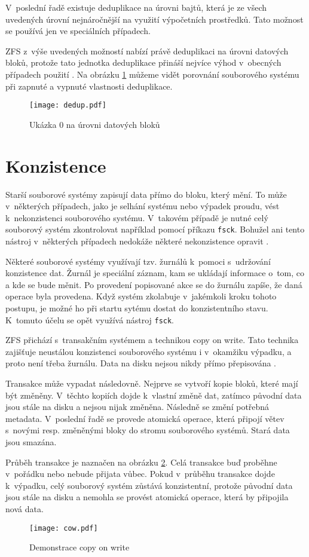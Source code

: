 V~poslední řadě existuje deduplikace na úrovni bajtů, která je ze všech uvedených úrovní nejnáročnější na využití výpočetních prostředků. Tato možnost se používá jen ve speciálních případech.

ZFS z~výše uvedených možností nabízí právě deduplikaci na úrovni datových bloků, protože tato jednotka deduplikace přináší nejvíce výhod v~obecných případech použití \cite{dedup}. Na obrázku \ref{blockdedup} můžeme vidět porovnání souborového systému při zapnuté a vypnuté vlastnosti deduplikace.
\begin{figure}
    \texttt{[image: dedup.pdf]}
    \caption{Ukázka 0 na úrovni datových bloků}
    \label{blockdedup}
\end{figure}
\section{Konzistence}
\label{consitence}
Starší souborové systémy zapisují data přímo do bloku, který mění. To může v~některých případech, jako je selhání systému nebo výpadek proudu, vést k~nekonzistenci souborového systému. V~takovém případě je nutné celý souborový systém zkontrolovat například pomocí příkazu \verb|fsck|. Bohužel ani tento nástroj v~některých případech nedokáže některé nekonzistence opravit \cite{transaction}.

Některé souborové systémy využívají tzv. žurnálů k~pomoci s~udržování konzistence dat. Žurnál je speciální záznam, kam se ukládají informace o~tom, co a kde se bude měnit. Po provedení popisované akce se do žurnálu zapíše, že daná operace byla provedena. Když systém zkolabuje v~jakémkoli kroku tohoto postupu, je možné ho při startu sytému dostat do konzistentního stavu. K~tomuto účelu se opět využívá nástroj \verb|fsck|.

ZFS přichází s~transakčním systémem a technikou copy on write. Tato technika zajišťuje neustálou konzistenci souborového systému i v~okamžiku výpadku, a proto není třeba žurnálu. Data na disku nejsou nikdy přímo přepisována \cite{transaction}.

Transakce může vypadat následovně. Nejprve se vytvoří kopie bloků, které mají být změněny. V~těchto kopiích dojde k~vlastní změně dat, zatímco původní data jsou stále na disku a nejsou nijak změněna. Následně se změní potřebná metadata. V~poslední řadě se provede atomická operace, která připojí větev s~novými resp. změněnými bloky do stromu souborového systémů. Stará data jsou smazána.

Průběh transakce je naznačen na obrázku \ref{cow}. Celá transakce buď proběhne v~pořádku nebo nebude přijata vůbec. Pokud v~průběhu transakce dojde k~výpadku, celý souborový systém zůstává konzistentní, protože původní data jsou stále na disku a nemohla se provést atomická operace, která by připojila nová data.
\begin{figure}
    \centering
    \texttt{[image: cow.pdf]}
    \caption{Demonstrace copy on write}
    \label{cow}
\end{figure}
